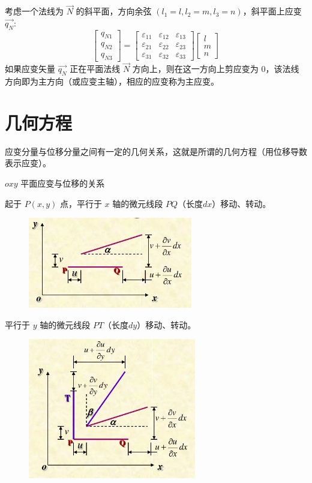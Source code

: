 \documentclass[12pt,a4paper]{article}
\begin{document}
考虑一个法线为 $\overrightarrow{N}$ 的斜平面，方向余弦 $(l_1=l,l_2=m,l_3=n)$，斜平面上应变 $\overrightarrow{q_N}$:
$$
\begin{bmatrix}
q_{N1} \\
q_{N2} \\
q_{N3}
\end{bmatrix}=
\begin{bmatrix}
\varepsilon_{11} & \varepsilon_{12} & \varepsilon_{13} \\
\varepsilon_{21} & \varepsilon_{22} & \varepsilon_{23} \\
\varepsilon_{31} & \varepsilon_{32} & \varepsilon_{33}
\end{bmatrix}
\begin{bmatrix}
l \\
m \\
n
\end{bmatrix}
$$
如果应变矢量 $\overrightarrow{q_N}$ 正在平面法线 $\overrightarrow{N}$ 方向上，则在这一方向上剪应变为 $0$，该法线方向即为主方向（或应变主轴），相应的应变称为主应变。

\section{几何方程}
应变分量与位移分量之间有一定的几何关系，这就是所谓的几何方程（用位移导数表示应变）。

$oxy$ 平面应变与位移的关系

起于 $P(x,y)$ 点，平行于 $x$ 轴的微元线段 $PQ$（长度$dx$）移动、转动。

\begin{figure}[H]
\centering
\includegraphics[scale=0.5]{./figures/13.png}
\caption{}
\end{figure}

平行于 $y$ 轴的微元线段 $PT$（长度$dy$）移动、转动。

\begin{figure}[H]
\centering
\includegraphics[scale=0.5]{./figures/14.png}
\caption{}
\end{figure}
\end{document}

